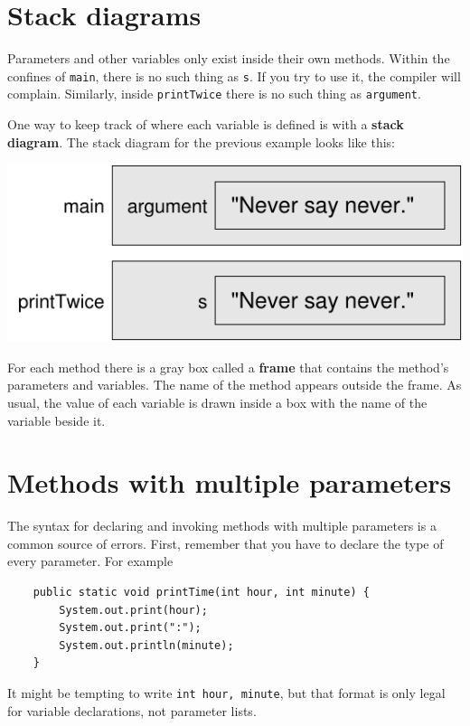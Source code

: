 \documentclass[12pt]{book}
\theoremstyle{exercise}
\begin{document}
\section {Stack diagrams}
\label{stack}

Parameters and other
variables only exist inside their own methods.  Within the
confines of {\tt main}, there is no such thing as {\tt s}.
If you try to use it, the compiler will complain.  Similarly,
inside {\tt printTwice} there is no such thing as {\tt argument}.

One way to keep track of where each variable is defined is
with a {\bf stack diagram}.  The stack diagram for the previous
example looks like this:

\includegraphics{figs/stack.pdf}

For each method there is a gray box called a {\bf frame} that contains
the method's parameters and variables.  The name of the method
appears outside the frame.  As usual, the value of each variable
is drawn inside a box with the name of the variable beside it.



\section {Methods with multiple parameters}
\label{time}

The syntax for declaring and invoking methods with multiple
parameters is a common source of errors.  First, remember
that you have to declare the type of every parameter.  For
example

\begin{lstlisting}
    public static void printTime(int hour, int minute) {
        System.out.print(hour);
        System.out.print(":");
        System.out.println(minute);
    }
\end{lstlisting}
%
It might be tempting to write {\tt int hour, minute}, but
that format is only legal for variable declarations, not
parameter lists.
\end{document}
